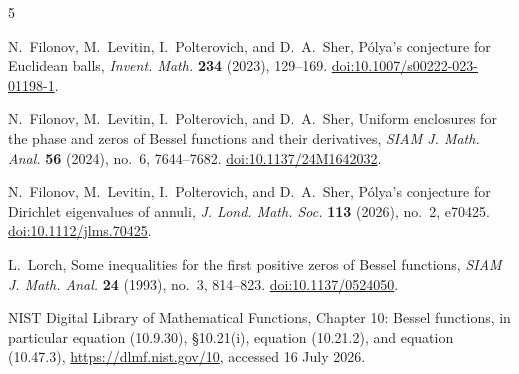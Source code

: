\documentclass[11pt]{article}
\numberwithin{equation}{section}
\theoremstyle{definition}
\theoremstyle{remark}
\begin{document}
\begin{thebibliography}{5}

N.~Filonov, M.~Levitin, I.~Polterovich, and D.~A.~Sher,
\newblock P\'olya's conjecture for Euclidean balls,
\newblock \emph{Invent. Math.} \textbf{234} (2023), 129--169.
\newblock \href{https://doi.org/10.1007/s00222-023-01198-1}{doi:10.1007/s00222-023-01198-1}.

N.~Filonov, M.~Levitin, I.~Polterovich, and D.~A.~Sher,
\newblock Uniform enclosures for the phase and zeros of Bessel functions and
their derivatives,
\newblock \emph{SIAM J. Math. Anal.} \textbf{56} (2024), no.~6, 7644--7682.
\newblock \href{https://doi.org/10.1137/24M1642032}{doi:10.1137/24M1642032}.

N.~Filonov, M.~Levitin, I.~Polterovich, and D.~A.~Sher,
\newblock P\'olya's conjecture for Dirichlet eigenvalues of annuli,
\newblock \emph{J. Lond. Math. Soc.} \textbf{113} (2026), no.~2, e70425.
\newblock \href{https://doi.org/10.1112/jlms.70425}{doi:10.1112/jlms.70425}.

L.~Lorch,
\newblock Some inequalities for the first positive zeros of Bessel
functions,
\newblock \emph{SIAM J. Math. Anal.} \textbf{24} (1993), no.~3, 814--823.
\newblock \href{https://doi.org/10.1137/0524050}{doi:10.1137/0524050}.

NIST Digital Library of Mathematical Functions,
\newblock Chapter 10: Bessel functions, in particular equation (10.9.30),
\S10.21(i), equation (10.21.2), and equation (10.47.3),
\newblock \url{https://dlmf.nist.gov/10}, accessed 16 July 2026.

\end{thebibliography}
\end{document}
